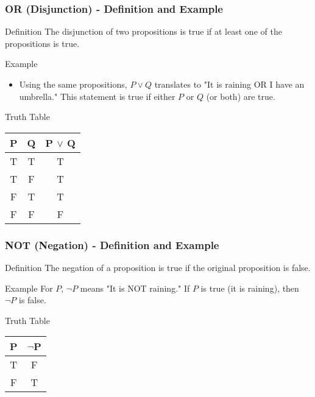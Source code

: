 \documentclass[aspectratio=169]{beamer}
\begin{document}
\begin{frame}[fragile]
    \frametitle{OR (Disjunction) - Definition and Example}
    \begin{block}{Definition}
        The disjunction of two propositions is true if at least one of the propositions is true.
    \end{block}
    \begin{block}{Example}
        \begin{itemize}
            \item Using the same propositions, \( P \lor Q \) translates to "It is raining OR I have an umbrella." This statement is true if either \( P \) or \( Q \) (or both) are true.
        \end{itemize}
    \end{block}
    \begin{block}{Truth Table}
        \begin{tabular}{|c|c|c|}
            \hline
            P & Q & P $\lor$ Q \\
            \hline
            T & T & T \\
            T & F & T \\
            F & T & T \\
            F & F & F \\
            \hline
        \end{tabular}
    \end{block}
\end{frame}

\begin{frame}[fragile]
    \frametitle{NOT (Negation) - Definition and Example}
    \begin{block}{Definition}
        The negation of a proposition is true if the original proposition is false.
    \end{block}
    \begin{block}{Example}
        For \( P \), \( \neg P \) means "It is NOT raining." If \( P \) is true (it is raining), then \( \neg P \) is false.
    \end{block}
    \begin{block}{Truth Table}
        \begin{tabular}{|c|c|}
            \hline
            P & $\neg$P \\
            \hline
            T & F \\
            F & T \\
            \hline
        \end{tabular}
    \end{block}
\end{frame}
\end{document}
